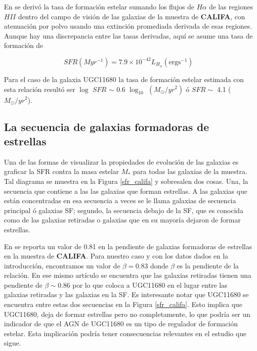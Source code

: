 \bigskip

\noindent En \citep{sanchez2013} se derivó la tasa de formación estelar sumando los flujos de $H \alpha$ de las regiones $HII$ dentro del campo de visión de las galaxias de la muestra de \textbf{CALIFA}, con atenuación por polvo usando una extinción promediada derivada de esas regiones. Aunque hay una discrepancia entre las tasas derivadas, aquí se asume una tasa de formación de \citep{kennicutt1998}


\begin{equation}
SFR(Myr^{-1})= 7.9 \times 10^{-42} L_{H_{\alpha}} (\text{erg} \text{s}^{-1})
\label{tasa}
\end{equation}



\noindent Para el caso de la galaxia UGC11680 la tasa de formación estelar estimada con esta relación resultó ser $\log$ $SFR$ $\sim$ 0.6 $\log_{10}$ $(M_{\odot}/yr^2)$ ó $SFR \sim $  4.1 ($M_{\odot}/yr^2$).

\subsection{La secuencia de galaxias formadoras de estrellas}

Una de las formas de visualizar la propiedades de evolución de las galaxias es graficar la SFR contra la masa estelar $M_{*}$
para todas las galaxias de la muestra. Tal diagrama se muestra en la Figura \ref{sfr_califa} y sobresalen dos cosas. Una, la secuencia que contiene a las las galaxias que forman estrellas. A las galaxias que están concentradas en esa secuencia a veces se le llama galaxias de secuencia principal ó galaxias SF; segundo, la secuencia debajo de la SF, que es conocida como de las galaxias retiradas o galaxias que en su mayoría dejaron de formar estrellas.

\bigskip

\noindent En \citep{cano2016} se reporta un valor de 0.81 en la pendiente de galaxias formadoras de estrellas en la muestra de \textbf{CALIFA}. Para nuestro caso y con los datos dados en la
introducción, encontramos un valor de $\beta=0.83$ donde $\beta$  es la pendiente de la relación. En ese mismo artículo
se encuentra que las galaxias retiradas tienen una pendiente de $\beta \sim 0.86$  por lo que coloca a UGC11680 en el
lugar entre las galaxias retiradas y las galaxias en la SF. Es interesante notar que  UGC11680 se encuentra entre estas dos secuencias en la Figura \ref{sfr_califa}. Esto implica que  UGC11680, deja de formar estrellas pero no completamente, lo que podría ser un indicador de que el AGN de UGC11680 es un tipo de regulador de formación estelar. Esta implicación podría tener consecuencias relevantes en el estudio que sigue.



